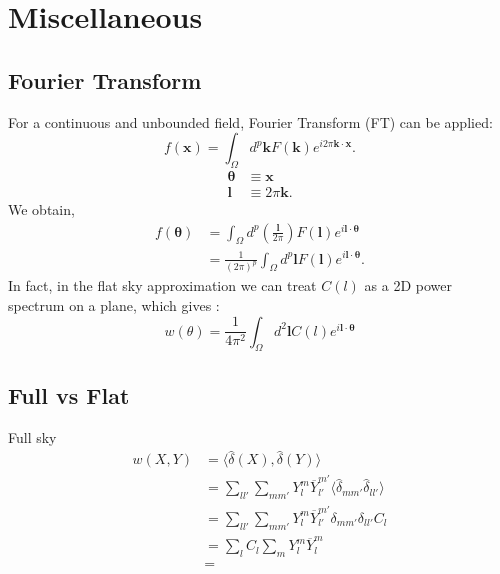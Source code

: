 \chapter{Miscellaneous}
\section{Fourier Transform}
For a continuous and unbounded field, Fourier Transform (FT) can be applied:
\begin{equation}
    f(\bm{x}) = \int_\Omega d^p\bm{k} F(\bm{k}) e^{i2\pi\bm{k}\cdot\bm{x}}.
\end{equation}
\begin{align}
    \bm{\theta} &\equiv \bm{x}\\
    \bm{l} &\equiv 2\pi\bm{k}.
\end{align}
We obtain,
\begin{align}
    f(\bm{\theta}) &= \int_\Omega d^p \left(\frac{\bm{l}}{2\pi}\right) F(\bm{l}) e^{i\bm{l}\cdot\bm{\theta}}\\
    & = \frac{1}{(2\pi)^p}\int_\Omega d^p\bm{l} F(\bm{l}) e^{i\bm{l}\cdot\bm{\theta}}.
\end{align}
In fact, in the flat sky approximation we can treat $C(l)$ as a 2D power spectrum on a plane, which gives \cite{dodelson}:
\begin{equation}
    w(\theta)=\frac{1}{4\pi^2}\int_\Omega d^2\bm{l} C(l) e^{i\bm{l}\cdot\bm{\theta}} 
\end{equation}

\section{Full vs Flat}
Full sky
\begin{align}
    w(X,Y) &=\langle \hat{\delta}(X), \hat{\delta}(Y)\rangle \nonumber \\
    &= \sum_{ll'}\sum_{mm'} Y^m_l \overline{Y}^{m'}_{l'} \langle \hat{\delta}_{mm'}\hat{\delta}_{ll'} \rangle \nonumber \\
    &= \sum_{ll'}\sum_{mm'} Y^m_l \overline{Y}^{m'}_{l'}\delta_{mm'}\delta_{ll'}C_l \nonumber \\
    &= \sum_{l}C_l\sum_{m} Y^m_l \overline{Y}^{m}_{l} \nonumber \\
    &=
\end{align}

